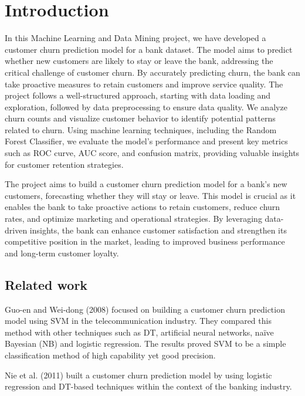 \documentclass[11pt,a4paper]{article}
\begin{document}


\tableofcontents

\newpage

\section{Introduction}

In this Machine Learning and Data Mining project, we have developed a customer churn prediction model for a bank dataset. The model aims to predict whether new customers are likely to stay or leave the bank, addressing the critical challenge of customer churn. By accurately predicting churn, the bank can take proactive measures to retain customers and improve service quality. The project follows a well-structured approach, starting with data loading and exploration, followed by data preprocessing to ensure data quality. We analyze churn counts and visualize customer behavior to identify potential patterns related to churn. Using machine learning techniques, including the Random Forest Classifier, we evaluate the model's performance and present key metrics such as ROC curve, AUC score, and confusion matrix, providing valuable insights for customer retention strategies.

The project aims to build a customer churn prediction model for a bank's new customers, forecasting whether they will stay or leave. This model is crucial as it enables the bank to take proactive actions to retain customers, reduce churn rates, and optimize marketing and operational strategies. By leveraging data-driven insights, the bank can enhance customer satisfaction and strengthen its competitive position in the market, leading to improved business performance and long-term customer loyalty.

\subsection{Related work}

Guo-en and Wei-dong (2008) focused on building a customer churn prediction model using SVM in the telecommunication industry. They compared this method with other techniques such as DT, artificial neural networks, naïve Bayesian (NB) and logistic regression. The results proved SVM to be a simple classification method of high capability yet good precision. \cite{article}

Nie et al. (2011) built a customer churn prediction model by using logistic regression and DT-based techniques within the context of the banking industry. \cite{journals/eswa/NieRZTS11}
\end{document}
